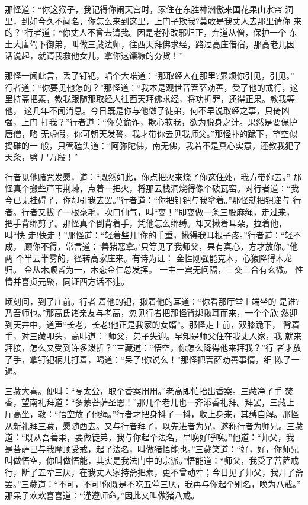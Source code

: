 那怪道：“你这猴子，我记得你闹天宫时，家住在东胜神洲傲来国花果山水帘
洞里，到如今久不闻名，你怎么来到这里，上门子欺我?莫敢是我丈人去那里请你
来的？”行者道：“你丈人不曾去请我。因是老孙改邪归正，弃道从僧，保护一个
东土大唐驾下御弟，叫做三藏法师，往西天拜佛求经，路过高庄借宿，那高老儿因
话说起，就请我救他女儿，拿你这馕糠的夯货！”

那怪一闻此言，丢了钉钯，唱个大喏道：“那取经人在那里?累烦你引见，引见。”
行者道：“你要见他怎的？”那怪道：“我本是观世音菩萨劝善，受了他的戒行，这
里持斋把素，教我跟随那取经人往西天拜佛求经，将功折罪，还得正果。教我等他，
这几年不闻消息。今日既是你与他做了徒弟，何不早说取经之事，只倚凶强，上门
打我？”行者道：“你莫诡诈，欺心软我，欲为脱身之计。果然是要保护唐僧，略
无虚假，你可朝天发誓，我才带你去见我师父。”那怪扑的跪下，望空似捣碓的一
般，只管磕头道：“阿弥陀佛，南无佛，我若不是真心实意，还教我犯了天条，劈
尸万段！”

行者见他赌咒发愿，道：“既然如此，你点把火来烧了你这住处，我方带你去。”
那怪真个搬些芦苇荆棘，点着一把火，将那云栈洞烧得像个破瓦窑。对行者道：“我
今已无挂碍了，你却引我去罢。”行者道：“你把钉钯与我拿着。”那怪就把钯递与
行者。行者又拔了一根毫毛，吹口仙气，叫“变！”即变做一条三股麻绳，走过来，
把手背绑剪了。那怪真个倒背着手，凭他怎么绑缚。却又揪着耳朵，拉着他，叫“快
走!快走！”那怪道：“轻着些儿!你的手重，揪得我耳根子疼。”行者道：“轻不成，
顾你不得，常言道：‘善猪恶拿。’只等见了我师父，果有真心，方才放你。”他两
个半云半雾的，径转高家庄来。有诗为证：
金性刚强能克木，心猿降得木龙归。
金从木顺皆为一，木恋金仁总发挥。
一主一宾无间隔，三交三合有玄微。
性情并喜贞元聚，同证西方话不违。

顷刻间，到了庄前。行者着他的钯，揪着他的耳道：“你看那厅堂上端坐的
是谁?乃吾师也。”那高氏诸亲友与老高，忽见行者把那怪背绑揪耳而来，一个个欣
然迎到天井中，道声“长老，长老!他正是我家的女婿”。那怪走上前，双膝跪下，
背着手，对三藏叩头，高叫道：“师父，弟子失迎。早知是师父住在我丈人家，我
就来拜接，怎么又受到许多泼折？”三藏道：“悟空，你怎么降得他来拜我？”行
者才放了手，拿钉钯柄儿打着，喝道：“呆子!你说么！”那怪把菩萨劝善事情，细
陈了一遍。

三藏大喜。便叫：“高太公，取个香案用用。”老高即忙抬出香案。三藏净了手
焚香，望南礼拜道：“多蒙菩萨圣恩！”那几个老儿也一齐添香礼拜。拜罢，三藏上
厅高坐，教：“悟空放了他绳。”行者才把身抖了一抖，收上身来，其缚自解。那怪
从新礼拜三藏，愿随西去。又与行者拜了，以先进者为兄，遂称行者为师兄。三藏
道：“既从吾善果，要做徒弟，我与你起个法名，早晚好呼唤。”他道：“师父，我
是菩萨已与我摩顶受戒，起了法名，叫做猪悟能也。”三藏笑道：“好，好，你师兄
叫做悟空，你叫做悟能，其实是我法门中的宗派。”悟能道：“师父，我受了菩萨戒
行，断了五荤三厌，在我丈人家持斋把素，更不曾动荤；今日见了师父，我开了斋
罢。”三藏道：“不可，不可!你既是不吃五荤三厌，我再与你起个别名，唤为八戒。”
那呆子欢欢喜喜道：“谨遵师命。”因此又叫做猪八戒。

